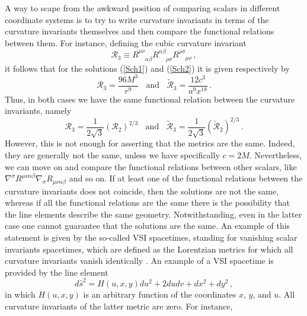 \documentclass[twocolumn,prd,aps,showpacs,showkeys,amsmath,amssymb]{revtex4-1}
\newcommand{\ph}{\phantom}
\begin{document}
A way to scape from the awkward position of comparing scalars in different coordinate systems is to try to write curvature invariants in terms of the curvature invariants themselves and then compare the functional relations between them. For instance, defining the cubic curvature invariant
\begin{equation*}
  \mathcal{R}_3\equiv R^{\mu\nu}_{\ph{\mu\nu}\alpha\beta}R^{\alpha\beta}_{\ph{\alpha\beta}\rho\sigma}R^{\rho\sigma}_{\ph{\rho\sigma}\mu\nu}\,,
\end{equation*}
it follows that for the solutions (\ref{Sch1}) and  (\ref{Sch2}) it is given respectively by
\begin{equation*}
 \mathcal{R}_3 =  \frac{96M^3}{r^9}  \;\; \textrm{ and } \;\;
 \tilde{\mathcal{R}}_3 =\frac{12c^3}{a^9 x^{18}} \,.
\end{equation*}
Thus, in both cases we have the same functional relation between the curvature invariants, namely
\begin{equation*}
  \mathcal{R}_3 = \frac{1}{2\sqrt{3}}  (\mathcal{R}_2)^{2/3}  \;\; \textrm{ and } \;\;
    \tilde{\mathcal{R}}_3 = \frac{1}{2\sqrt{3}}  (\tilde{\mathcal{R}}_2)^{2/3} \,.
\end{equation*}
However, this is not enough for asserting that the metrics are the same. Indeed, they are generally not the same, unless we have specifically $c=2M$. Nevertheless, we can move on and compare the functional relations between other scalars, like $\nabla^\sigma R^{\mu\nu\alpha\beta}\nabla_{\sigma}R_{\mu\nu\alpha\beta}$ and so on. If at least one of the functional relations between the curvature invariants does not coincide, then the solutions are not the same, whereas if all the functional relations are the same there is the possibility that the line elements describe the same geometry. Notwithstanding, even in the latter case one cannot guarantee that the solutions are the same. An example of this statement is given by the so-called VSI spacetimes, standing for vanishing scalar invariants spacetimes, which are defined as the Lorentzian metrics for which all curvature invariants vanish identically \cite{Coley1,Coley2}. An example of a VSI spacetime is provided by the line element
\begin{equation}\label{VSI}
  d\hat{s}^2 = H(u,x,y)du^2 + 2dudv + dx^2 + dy^2 \,,
\end{equation}
in which $H(u,x,y)$ is an arbitrary function of the coordinates $x$, $y$, and $u$. All curvature invariants of the latter metric are zero. For instance,
\end{document}
